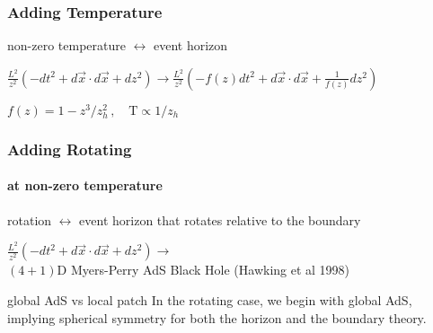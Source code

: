 \documentclass{beamer}
\begin{document}
\begin{frame}
  \frametitle{Adding Temperature}

  \begin{block}{}non-zero temperature $\longleftrightarrow$ event horizon\end{block}

  \begin{block}{}
    $\frac {L^2}{z^2} \left( -dt^2 + d\vec x\cdot d\vec x + dz^2 \right) \rightarrow \frac {L^2}{z^2} \left( -f(z) dt^2 + d\vec x\cdot d\vec x + \frac 1{f(z)}dz^2 \right)$

    $ f(z) = 1 - z^3/z_h^2\,, \quad \mathrm T \propto 1/z_h $
  \end{block}


\end{frame}

\begin{frame}
  \frametitle{Adding Rotating}
  \framesubtitle{at non-zero temperature}

  \begin{block}{}rotation $\longleftrightarrow$ event horizon that rotates relative to the boundary\end{block}

  \begin{block}{}
    $\frac {L^2}{z^2} \left( -dt^2 + d\vec x\cdot d\vec x + dz^2 \right) \rightarrow$ \\$(4+1)$D Myers-Perry AdS Black Hole (Hawking et al 1998)
  \end{block}

  \begin{alertblock}{global AdS vs local patch}
    In the rotating case, we begin with global AdS, implying spherical symmetry for both the horizon and the boundary theory.
  \end{alertblock}


\end{frame}


\end{document}
